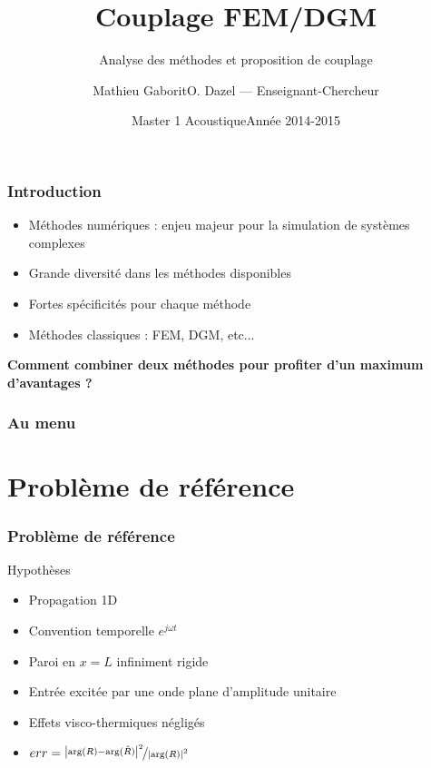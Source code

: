 \documentclass[10pt, compress]{beamer}
\title{Couplage FEM/DGM}
\subtitle{Analyse des méthodes et proposition de couplage}
\date{Master 1 Acoustique\hfill Année 2014-2015}
\author{Mathieu Gaborit\hfill O. Dazel --- Enseignant-Chercheur}
\institute{Université du Maine}
\begin{document}
\maketitle

\begin{frame}[fragile]
    \frametitle{Introduction}

    \begin{itemize}
        \item Méthodes numériques : enjeu majeur pour la simulation de systèmes complexes
        \item Grande diversité dans les méthodes disponibles
        \item Fortes spécificités pour chaque méthode
        \item Méthodes classiques : FEM, DGM, etc...
    \end{itemize}

    \pause
    \begin{center}
        \alert{\textbf{Comment combiner deux méthodes pour profiter d'un maximum d'avantages ?}}
    \end{center}
\end{frame}

\begin{frame}
	\frametitle{Au menu}
	\tableofcontents
\end{frame}

\section{Problème de référence}

\begin{frame}
	\frametitle{Problème de référence}
	\begin{center}
        \begin{tikzpicture}[>=stealth,scale=0.8,transform shape]
		
        \end{tikzpicture}
	\end{center}

	\begin{block}{Hypothèses}
		\begin{itemize}
			\item Propagation 1D
			\item Convention temporelle $e^{j\omega t}$
			\item Paroi en $x=L$ infiniment rigide
			\item Entrée excitée par une onde plane d'amplitude unitaire
			\item Effets visco-thermiques négligés
			\item $err = \nicefrac{\left|\arg(R) - \arg(\hat{R})\right|^2}{\left|\arg(R)\right|^2}$
		\end{itemize}
	\end{block}
\end{frame}
\end{document}
